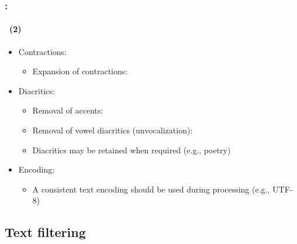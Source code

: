 \documentclass[xcolor=table]{beamer}
\begin{document}
\begin{frame}
	\frametitle{\insertshortsubtitle: \insertsection}
	\framesubtitle{\insertsubsection\ (2)}
	
	\begin{itemize}
		\item Contractions:
		\begin{itemize}
			\item Expansion of contractions: 
		\end{itemize}
		
		\item Diacritics:
		\begin{itemize}
			\item Removal of accents:  
			\item Removal of vowel diacritics (unvocalization):    
			\item Diacritics may be retained when required (e.g., poetry)
		\end{itemize}
		
		\item Encoding:
		\begin{itemize}
			\item A consistent text encoding should be used during processing (e.g., UTF-8)
		\end{itemize}
		
	\end{itemize}

\end{frame}

\subsection{Text filtering}
\end{document}
